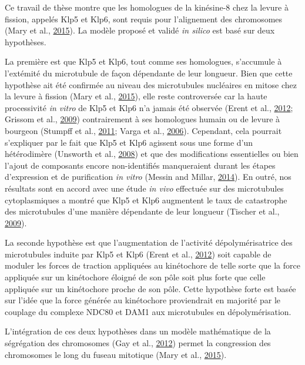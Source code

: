 \documentclass[12pt,a4paper,twoside,openright]{book}
\begin{document}
Ce travail de thèse montre que les homologues de la kinésine-8 chez la
levure à fission, appelés Klp5 et Klp6, sont requis pour l'alignement
des chromosomes (Mary et al., \protect\hyperlink{ref-Mary2015}{2015}).
La modèle proposé et validé \emph{in silico} est basé sur deux
hypothèses.

La première est que Klp5 et Klp6, tout comme ses homologues, s'accumule
à l'extémité du microtubule de façon dépendante de leur longueur. Bien
que cette hypothèse ait été confirmée au niveau des microtubules
nucléaires en mitose chez la levure à fission (Mary et al.,
\protect\hyperlink{ref-Mary2015}{2015}), elle reste controversée car la
haute processivité \emph{in vitro} de Klp5 et Klp6 n'a jamais été
observée (Erent et al., \protect\hyperlink{ref-Erent2012}{2012}; Grissom
et al., \protect\hyperlink{ref-Grissom2009}{2009}) contrairement à ses
homologues humain ou de levure à bourgeon (Stumpff et al.,
\protect\hyperlink{ref-Stumpff2011a}{2011}; Varga et al.,
\protect\hyperlink{ref-Varga2006}{2006}). Cependant, cela pourrait
s'expliquer par le fait que Klp5 et Klp6 agissent sous une forme d'un
hétérodimère (Unsworth et al.,
\protect\hyperlink{ref-Unsworth2008}{2008}) et que des modifications
essentielles ou bien l'ajout de composants encore non-identifiés
manqueraient durant les étapes d'expression et de purification \emph{in
vitro} (Messin and Millar, \protect\hyperlink{ref-Messin2014}{2014}). En
outré, nos résultats sont en accord avec une étude \emph{in vivo}
effectuée sur des microtubules cytoplasmiques a montré que Klp5 et Klp6
augmentent le taux de catastrophe des microtubules d'une manière
dépendante de leur longueur (Tischer et al.,
\protect\hyperlink{ref-Tischer2009}{2009}).

La seconde hypothèse est que l'augmentation de l'activité
dépolymérisatrice des microtubules induite par Klp5 et Klp6 (Erent et
al., \protect\hyperlink{ref-Erent2012}{2012}) soit capable de moduler
les forces de traction appliquées au kinétochore de telle sorte que la
force appliquée sur un kinétochore éloigné de son pôle soit plus forte
que celle appliquée sur un kinétochore proche de son pôle. Cette
hypothèse forte est basée sur l'idée que la force générée au kinétochore
proviendrait en majorité par le couplage du complexe NDC80 et DAM1 aux
microtubules en dépolymérisation.

L'intégration de ces deux hypothèses dans un modèle mathématique de la
ségrégation des chromosomes (Gay et al.,
\protect\hyperlink{ref-Gay2012a}{2012}) permet la congression des
chromosomes le long du fuseau mitotique (Mary et al.,
\protect\hyperlink{ref-Mary2015}{2015}).
\end{document}
